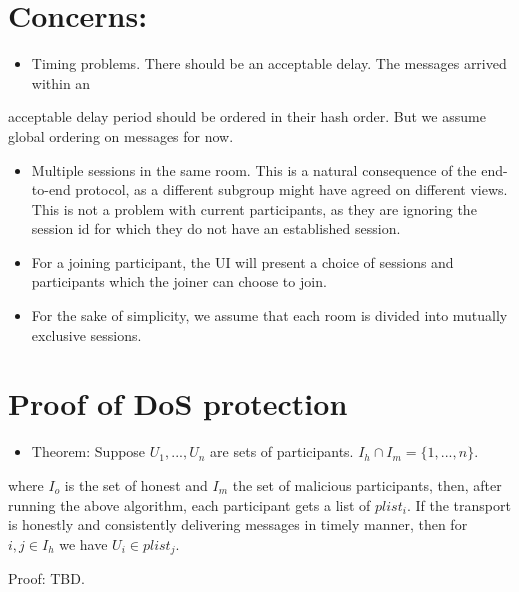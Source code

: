 \documentclass[11pt]{article}
\begin{document}
\section{Concerns:}
\label{sec-6}
\begin{itemize}
\item Timing problems. There should be an acceptable delay. The messages arrived within an
\end{itemize}
acceptable delay period should be ordered in their hash order. But we
assume global ordering on messages for now.

\begin{itemize}
\item Multiple sessions in the same room. This is a natural consequence of the end-to-end protocol, as a different subgroup might have agreed on different views. This is not a problem with current participants, as they are ignoring the session id for which they do not have an established session.
\item For a joining participant, the UI will present a choice of sessions and participants which the joiner can choose to join.
\item For the sake of simplicity, we assume that each room is divided into mutually exclusive sessions.
\end{itemize}

\section{Proof of DoS protection}
\label{sec-7}
\begin{itemize}
\item Theorem: Suppose $U_1,...,U_n$ are sets of participants. $I_h \cap I_m = \{1,...,n\}$.
\end{itemize}
where $I_o$ is the set of honest and $I_m$ the set of malicious participants, then, after running the above algorithm, each participant gets a list of $plist_i$. If the transport is honestly and consistently delivering messages in timely manner, then for $i,j \in I_h$  
we have $U_i \in plist_j$.

Proof: TBD.
\end{document}
